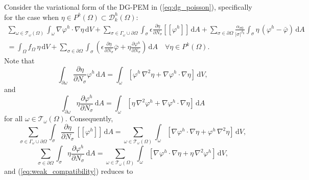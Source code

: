 	Consider the variational form of the DG-PEM in (\ref{eq:dg_poisson}), specifically for the case when $\eta \in P^k (\Omega) \subset \mathcal{D}^h_k (\Omega)$:
	\begin{eqnarray}
		\sum_{\omega \in \mathcal{T}_\omega (\Omega)} \int_{\omega} \nabla \varphi^h \cdot \nabla \eta \, \mathrm dV 
		+ \sum_{\sigma \in \Gamma_\omega \cup \partial \Omega} \int_{\sigma} \epsilon \frac{\partial \eta}{\partial N_{\sigma}} [\![ \varphi^h ]\!] \, \mathrm dA
		+ \sum_{\sigma \in \partial \Omega} \frac{\alpha_{\sigma0}}{|\sigma|^{\beta_0}} \int_{\sigma} \eta \, (\varphi^h - \bar{\varphi}) \, \mathrm dA \nonumber \\ 
		= \int_{\Omega} f_{\Omega} \, \eta \, \mathrm dV + \sum_{\sigma \in \partial \Omega} \int_{\sigma} \left( \epsilon \frac{\partial \eta}{\partial N_{\sigma}} \bar{\varphi} + \eta \frac{\partial \varphi^h}{\partial N_{\sigma}} \right) \, \mathrm dA \quad \forall \eta \in P^k (\Omega).
		\label{eq:weak_compatibility}
	\end{eqnarray}
Note that
\begin{equation}
	\int_{\partial \omega} \frac{\partial \eta}{\partial N_{\sigma}} \varphi^h \, \mathrm dA = \int_{\omega} \left[ \varphi^h \, \nabla^2 \eta  + \nabla \varphi^h \cdot \nabla \eta \right] \, \mathrm dV,
\end{equation}
and
\begin{equation}
	\int_{\partial \omega} \eta \frac{\partial \varphi^h}{\partial N_{\sigma}} \, \mathrm dA = \int_{\omega} \left[ \eta \, \nabla^2 \varphi^h + \nabla \varphi^h \cdot \nabla \eta \right] \, \mathrm dA
\end{equation}
for all $\omega \in \mathcal{T}_\omega (\Omega)$. Consequently,
	\begin{equation}
	\sum_{\sigma \in \Gamma_\omega \cup \partial \Omega} \int_{\sigma} \frac{\partial \eta}{\partial N_{\sigma}} \, [\![ \varphi^h ]\!] \, \mathrm dA = \sum_{\omega \in \mathcal{T}_\omega (\Omega)} \int_{\omega} \left[ \nabla \varphi^h \cdot \nabla \eta + \varphi^h \, \nabla^2 \eta \right] \, \mathrm dV,
	\end{equation}
	\begin{equation}
	 \sum_{\sigma \in \partial \Omega} \int_{\sigma} \eta \frac{\partial \varphi^h}{\partial N_{\sigma}} \, \mathrm dA = \sum_{\omega \in \mathcal{T}_\omega (\Omega)} \int_{\omega} \left[ \nabla \varphi^h \cdot \nabla \eta + \eta \, \nabla^2 \varphi^h \right] \, \mathrm dV,
	\end{equation}
and (\ref{eq:weak_compatibility}) reduces to
